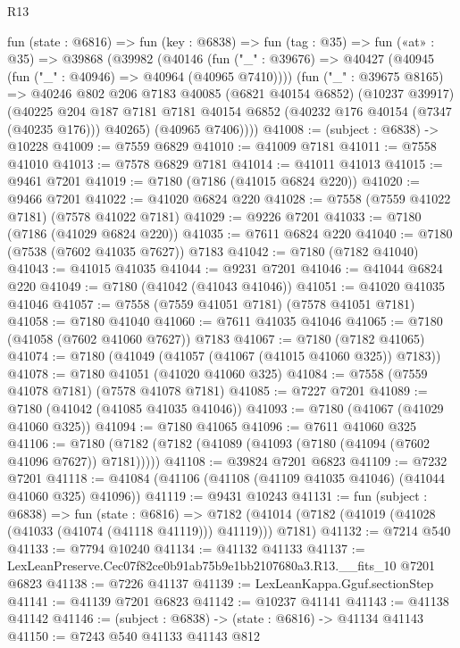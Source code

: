 \begin{lexlean}{R13}
\begin{coremodule}
  fun (state : @6816) =>
  fun (key : @6838) =>
  fun (tag : @35) =>
  fun («at» : @35) =>
  @39868
    (@39982
      (@40146
        (fun ("_" : @39676) => @40427 (@40945 (fun ("_" : @40946) => @40964 (@40965 @7410))))
        (fun ("_" : @39675 @8165) =>
        @40246
          @802
          @206
          @7183
          @40085
          (@6821 @40154 @6852)
          (@10237 @39917)
          (@40225
            @204
            @187
            @7181
            @7181
            @40154
            @6852
            (@40232 @176 @40154 (@7347 (@40235 @176)))
            @40265)
          (@40965 @7406))))
@41008 := (subject : @6838) -> @10228
@41009 := @7559 @6829
@41010 := @41009 @7181
@41011 := @7558 @41010
@41013 := @7578 @6829 @7181
@41014 := @41011 @41013
@41015 := @9461 @7201
@41019 := @7180 (@7186 (@41015 @6824 @220))
@41020 := @9466 @7201
@41022 := @41020 @6824 @220
@41028 := @7558 (@7559 @41022 @7181) (@7578 @41022 @7181)
@41029 := @9226 @7201
@41033 := @7180 (@7186 (@41029 @6824 @220))
@41035 := @7611 @6824 @220
@41040 := @7180 (@7538 (@7602 @41035 @7627)) @7183
@41042 := @7180 (@7182 @41040)
@41043 := @41015 @41035
@41044 := @9231 @7201
@41046 := @41044 @6824 @220
@41049 := @7180 (@41042 (@41043 @41046))
@41051 := @41020 @41035 @41046
@41057 := @7558 (@7559 @41051 @7181) (@7578 @41051 @7181)
@41058 := @7180 @41040
@41060 := @7611 @41035 @41046
@41065 := @7180 (@41058 (@7602 @41060 @7627)) @7183
@41067 := @7180 (@7182 @41065)
@41074 := @7180 (@41049 (@41057 (@41067 (@41015 @41060 @325)) @7183))
@41078 := @7180 @41051 (@41020 @41060 @325)
@41084 := @7558 (@7559 @41078 @7181) (@7578 @41078 @7181)
@41085 := @7227 @7201
@41089 := @7180 (@41042 (@41085 @41035 @41046))
@41093 := @7180 (@41067 (@41029 @41060 @325))
@41094 := @7180 @41065
@41096 := @7611 @41060 @325
@41106 := @7180 (@7182 (@7182 (@41089 (@41093 (@7180 (@41094 (@7602 @41096 @7627)) @7181)))))
@41108 := @39824 @7201 @6823
@41109 := @7232 @7201
@41118 := @41084 (@41106 (@41108 (@41109 @41035 @41046) (@41044 @41060 @325) @41096))
@41119 := @9431 @10243
@41131 := fun (subject : @6838) =>
  fun (state : @6816) =>
  @7182 (@41014 (@7182 (@41019 (@41028 (@41033 (@41074 (@41118 @41119))) @41119))) @7181)
@41132 := @7214 @540
@41133 := @7794 @10240
@41134 := @41132 @41133
@41137 := LexLeanPreserve.Cec07f82ce0b91ab75b9e1bb2107680a3.R13.__fits_10 @7201 @6823
@41138 := @7226 @41137
@41139 := LexLeanKappa.Gguf.sectionStep
@41141 := @41139 @7201 @6823
@41142 := @10237 @41141
@41143 := @41138 @41142
@41146 := (subject : @6838) -> (state : @6816) -> @41134 @41143
@41150 := @7243 @540 @41133 @41143 @812

\end{coremodule}
\end{lexlean}

